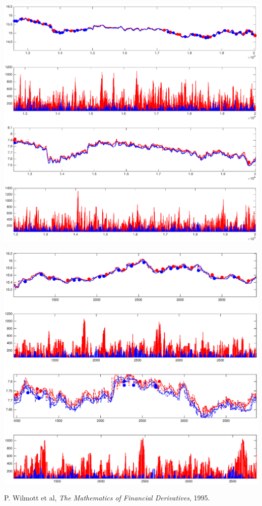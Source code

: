 \documentclass[8 pt]{article}
\newenvironment{Figure}
  {\par\medskip\noindent\minipage{\linewidth}}
  {\endminipage\par\medskip}
\begin{document}
\begin{Figure}
  \begin{center}
    \includegraphics[width=\textwidth]{graphs/result_closer_CBKDBK1.eps}
    \label{fig:results_1_closer}
  \end{center}
\end{Figure}

\begin{Figure}
  \begin{center}
    \includegraphics[width=\textwidth]{graphs/result_closer_b_CBKDBK1.eps}
    \label{fig:results_1_closer_b}
  \end{center}
\end{Figure}

\begin{thebibliography}{28}
\raggedright
{}

 P. Wilmott et al, \emph{The Mathematics of Financial Derivatives}, 1995.

\end{thebibliography}
\end{document}
